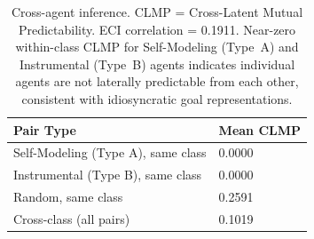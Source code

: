 \begin{table}[t]
\centering
\caption{Cross-agent inference. CLMP = Cross-Latent Mutual Predictability.
ECI correlation = 0.1911. Near-zero within-class CLMP for Self-Modeling (Type~A) and Instrumental (Type~B) agents
indicates individual agents are not laterally predictable from each other,
consistent with idiosyncratic goal representations.}
\label{tab:cross_agent}
\begin{tabular}{ll}
\toprule
Pair Type & Mean CLMP \\
\midrule
Self-Modeling (Type A), same class & 0.0000 \\
Instrumental (Type B), same class & 0.0000 \\
Random, same class & 0.2591 \\
Cross-class (all pairs) & 0.1019 \\
\bottomrule
\end{tabular}
\end{table}
